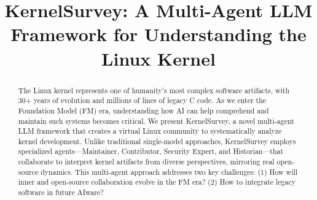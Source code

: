 \documentclass[sigconf,review,anonymous]{acmart}
\title{KernelSurvey: A Multi-Agent LLM Framework for Understanding the Linux Kernel}
\begin{document}




\begin{abstract} 

The Linux kernel represents one of humanity's most complex software artifacts, with 30+ years of evolution and millions of lines of legacy C code. As we enter the Foundation Model (FM) era, understanding how AI can help comprehend and maintain such systems becomes critical. We present KernelSurvey, a novel multi-agent LLM framework that creates a virtual Linux community to systematically analyze kernel development. Unlike traditional single-model approaches, KernelSurvey employs specialized agents—Maintainer, Contributor, Security Expert, and Historian—that collaborate to interpret kernel artifacts from diverse perspectives, mirroring real open-source dynamics. This multi-agent approach addresses two key challenges: (1) How will inner and open-source collaboration evolve in the FM era? (2) How to integrate legacy software in future AIware?


\end{abstract}
\end{document}
